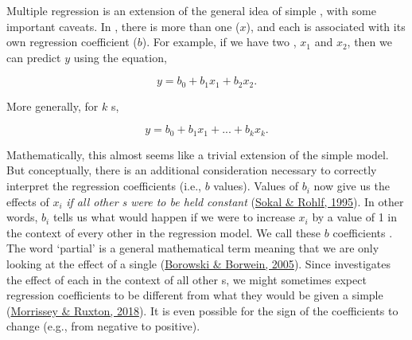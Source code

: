 \documentclass[
  openany]{krantz}
\begin{document}
Multiple regression is an extension of the general idea of simple , with some important caveats.
In , there is more than one  (\(x\)), and each  is associated with its own regression coefficient (\(b\)).
For example, if we have two , \(x_{1}\) and \(x_{2}\), then we can predict \(y\) using the equation,

\[y = b_{0} + b_{1}x_{1} + b_{2}x_{2}.\]

More generally, for \(k\) s,

\[y = b_{0} + b_{1}x_{1} + ... + b_{k}x_{k}.\]

Mathematically, this almost seems like a trivial extension of the simple  model.
But conceptually, there is an additional consideration necessary to correctly interpret the regression coefficients (i.e., \(b\) values).
Values of \(b_{i}\) now give us the  effects of \(x_{i}\) \emph{if all other s were to be held constant} (\protect\hyperlink{ref-Sokal1995}{Sokal \& Rohlf, 1995}).
In other words, \(b_{i}\) tells us what would happen if we were to increase \(x_{i}\) by a value of 1 in the context of every other  in the regression model.
We call these \(b\) coefficients \textbf{}.
The word `partial' is a general mathematical term meaning that we are only looking at the effect of a single  (\protect\hyperlink{ref-Borowski2005}{Borowski \& Borwein, 2005}).
Since  investigates the effect of each  in the context of all other s, we might sometimes expect regression coefficients to be different from what they would be given a simple  (\protect\hyperlink{ref-Morrissey2018}{Morrissey \& Ruxton, 2018}).
It is even possible for the sign of the coefficients to change (e.g., from negative to positive).
\end{document}
